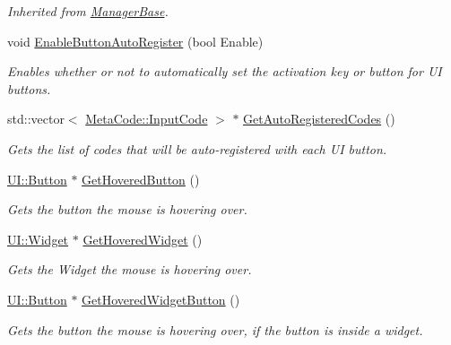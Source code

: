 \begin{DoxyCompactItemize}
\begin{DoxyCompactList}\small\item\em Inherited from \hyperlink{classphys_1_1ManagerBase}{ManagerBase}. \item\end{DoxyCompactList}\item 
void \hyperlink{classphys_1_1UIManager_a210e1607f0fa63aa44a1f7a6b4156f60}{EnableButtonAutoRegister} (bool Enable)
\begin{DoxyCompactList}\small\item\em Enables whether or not to automatically set the activation key or button for UI buttons. \item\end{DoxyCompactList}\item 
std::vector$<$ \hyperlink{classphys_1_1MetaCode_a3e501cbb5bf0f6f1fdb7211465bda8d8}{MetaCode::InputCode} $>$ $\ast$ \hyperlink{classphys_1_1UIManager_a4ba0a6ae3044fb70aeece69fd5befbf9}{GetAutoRegisteredCodes} ()
\begin{DoxyCompactList}\small\item\em Gets the list of codes that will be auto-\/registered with each UI button. \item\end{DoxyCompactList}\item 
\hyperlink{classphys_1_1UI_1_1Button}{UI::Button} $\ast$ \hyperlink{classphys_1_1UIManager_acd08dba5be95182a6c923ed698822277}{GetHoveredButton} ()
\begin{DoxyCompactList}\small\item\em Gets the button the mouse is hovering over. \item\end{DoxyCompactList}\item 
\hyperlink{classphys_1_1UI_1_1Widget}{UI::Widget} $\ast$ \hyperlink{classphys_1_1UIManager_a5772b611b6881eb98932f4b400b44d09}{GetHoveredWidget} ()
\begin{DoxyCompactList}\small\item\em Gets the Widget the mouse is hovering over. \item\end{DoxyCompactList}\item 
\hyperlink{classphys_1_1UI_1_1Button}{UI::Button} $\ast$ \hyperlink{classphys_1_1UIManager_a1dbcd08fc03131de3f68521a3d877071}{GetHoveredWidgetButton} ()
\begin{DoxyCompactList}\small\item\em Gets the button the mouse is hovering over, if the button is inside a widget. \item\end{DoxyCompactList}\item 

\end{DoxyCompactItemize}
